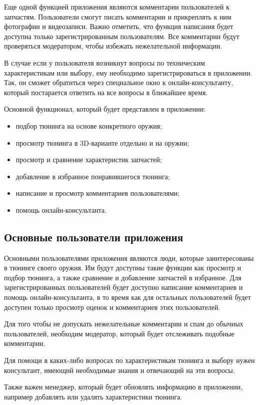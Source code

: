 \documentclass[14pt]{extreport}
\begin{document}
Еще одной функцией приложения являются комментарии пользователей к запчастям. Пользователи смогут писать комментарии и прикреплять к ним фотографии и видеозаписи. Важно отметить, что функция написания будет доступна только зарегистрированным пользователям. Все комментарии будут проверяться модератором, чтобы избежать нежелательной информации.

В случае если у пользователя возникнут вопросы по техническим характеристикам или выбору, ему необходимо зарегистрироваться в приложении. Так, он сможет обратиться через специальное окно к онлайн-консультанту, который постарается ответить на все вопросы в ближайшее время.

Основной функционал, который будет представлен в приложении:
\begin{itemize}
	\item подбор тюнинга на основе конкретного оружия;
	\item просмотр тюнинга в 3D-варианте отдельно и на оружии;
	\item просмотр и сравнение характеристик запчастей;
	\item добавление в избранное понравившегося тюнинга;
	\item написание и просмотр комментариев пользователями;
	\item помощь онлайн-консультанта.
\end{itemize}

\subsection{Основные пользователи приложения}

Основными пользователями приложения являются люди, которые заинтересованы в тюнинге своего оружия. Им будут доступны такие функции как просмотр и подбор тюнинга, а также сравнение и добавление запчастей в избранное. Для зарегистрированных пользователей будет доступно написание комментариев и помощь онлайн-консультанта, в то время как для остальных пользователей будет доступен только просмотр оценок и комментариев этих пользователей.

Для того чтобы не допускать нежелательные комментарии и спам до обычных пользователей, необходим модератор, который будет отслеживать подобные комментарии.

Для помощи в каких-либо вопросах по характеристикам тюнинга и выбору нужен консультант, имеющий необходимые знания и отвечающий на эти вопросы.

Также важен менеджер, который будет обновлять информацию в приложении, например добавлять или удалять характеристики тюнинга.
\end{document}
